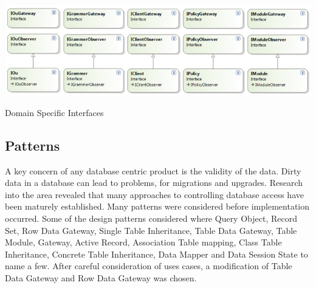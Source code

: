 		\noindent\begin{minipage}{\textwidth}
			
			\begin{figurehere}
				\centering
				\includegraphics[scale=0.65]{pages/chapter3/figures/domainspecificinterfaces.png}
				\caption{Domain Specific Interfaces}
				\label{fig:domaininterfaces}
			\end{figurehere}
		
		\end{minipage}		
	
	\subsection{Patterns}
	
		\normalsize
		{	
			A key concern of any database centric product is the validity of the data.
			Dirty data in a database can lead to problems, for migrations and upgrades.  Research into the area revealed that many approaches to 
			controlling database access have been maturely established.  Many patterns were considered before implementation occurred. 
			Some of the design patterns considered where Query Object, Record Set, Row Data Gateway, Single Table Inheritance, Table Data Gateway, Table Module,
			Gateway, Active Record, Association Table mapping, Class Table Inheritance, Concrete Table Inheritance, Data Mapper and Data Session State to name a few.
			After careful consideration of uses cases, a modification of Table Data Gateway and Row Data Gateway was chosen. 
			\newline
		}
		
